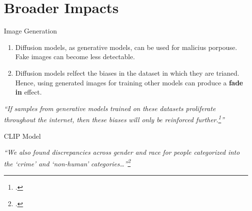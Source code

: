 \documentclass[aspectratio=169, 10pt]{beamer}
\theoremstyle{definition}
\begin{document}
\section{Broader Impacts}
\begin{frame}{Image Generation}
  \begin{enumerate}
    \item Diffusion models, as generative models, can be used for malicius
      porpouse. Fake images can become less detectable.
    \item Diffusion models relfect the biases in the dataset in which they
      are trianed. Hence, using generated images for training other
      models can produce a \textbf{fade in} effect.
  \end{enumerate}
  \pause
  \begin{center}
    \it``If samples from generative models trained on these datasets
    proliferate throughout the internet, then these biases will only be
    reinforced further.\footcite{ho}''
  \end{center}
\end{frame}
\begin{frame}{CLIP Model}
  \begin{center}
    \it
    ``We also found discrepancies across gender and race for people
    categorized into the ‘crime’ and ‘non-human’
    categories\ldots''\footcite{clip}
  \end{center}
\end{frame}
\end{document}
